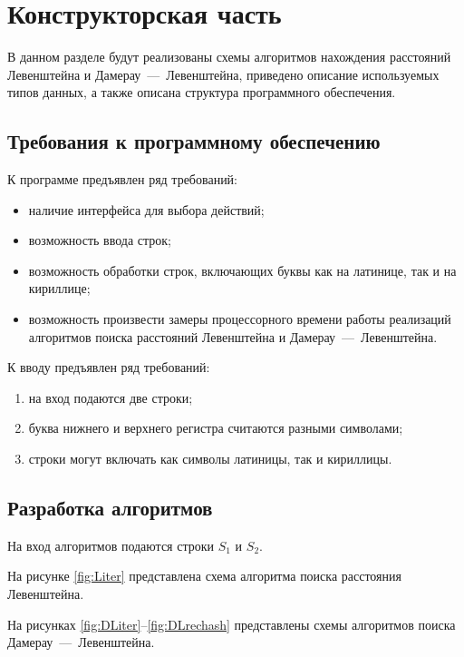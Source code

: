 \chapter{Конструкторская часть}

В данном разделе будут реализованы схемы алгоритмов нахождения расстояний Левенштейна и Дамерау~---~Левенштейна, приведено описание используемых типов данных, а также описана структура программного обеспечения.

\section{Требования к программному обеспечению}\label{section:requirements_1}
К программе предъявлен ряд требований:
\begin{itemize}
	\item наличие интерфейса для выбора действий;
	\item возможность ввода строк;
	\item возможность обработки строк, включающих буквы как на латинице, так и на кириллице;
	\item возможность произвести замеры процессорного времени работы реализаций алгоритмов поиска расстояний Левенштейна и Дамерау~---~Левенштейна.
\end{itemize}

К вводу предъявлен ряд требований:
\begin{enumerate}
    \item на вход подаются две строки;
    \item буква нижнего и верхнего регистра считаются разными символами;
    \item строки могут включать как символы латиницы, так и кириллицы.
\end{enumerate}

\section{Разработка алгоритмов}

На вход алгоритмов подаются строки $S_1$ и $S_2$.

На рисунке \ref{fig:Liter} представлена схема алгоритма поиска расстояния Левенштейна.

На рисунках \ref{fig:DLiter}--\ref{fig:DLrechash} представлены схемы алгоритмов поиска Дамерау~---~Левенштейна.


